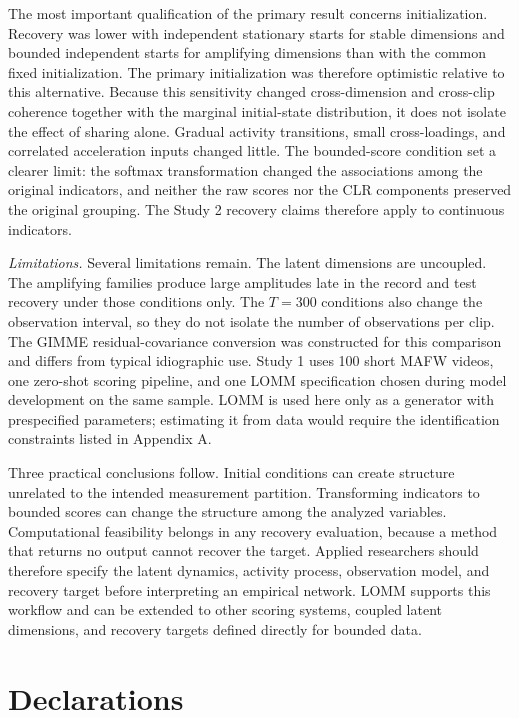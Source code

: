 \documentclass[
]{article}
\begin{document}
The most important qualification of the primary result concerns
initialization. Recovery was lower with independent stationary starts
for stable dimensions and bounded independent starts for amplifying
dimensions than with the common fixed initialization. The primary
initialization was therefore optimistic relative to this alternative.
Because this sensitivity changed cross-dimension and cross-clip
coherence together with the marginal initial-state distribution, it does
not isolate the effect of sharing alone. Gradual activity transitions,
small cross-loadings, and correlated acceleration inputs changed little.
The bounded-score condition set a clearer limit: the softmax
transformation changed the associations among the original indicators,
and neither the raw scores nor the CLR components preserved the original
grouping. The Study 2 recovery claims therefore apply to continuous
indicators.

\emph{Limitations.} Several limitations remain. The latent dimensions
are uncoupled. The amplifying families produce large amplitudes late in
the record and test recovery under those conditions only. The \(T=300\)
conditions also change the observation interval, so they do not isolate
the number of observations per clip. The GIMME residual-covariance
conversion was constructed for this comparison and differs from typical
idiographic use. Study 1 uses 100 short MAFW videos, one zero-shot
scoring pipeline, and one LOMM specification chosen during model
development on the same sample. LOMM is used here only as a generator
with prespecified parameters; estimating it from data would require the
identification constraints listed in Appendix A.

Three practical conclusions follow. Initial conditions can create
structure unrelated to the intended measurement partition. Transforming
indicators to bounded scores can change the structure among the analyzed
variables. Computational feasibility belongs in any recovery evaluation,
because a method that returns no output cannot recover the target.
Applied researchers should therefore specify the latent dynamics,
activity process, observation model, and recovery target before
interpreting an empirical network. LOMM supports this workflow and can
be extended to other scoring systems, coupled latent dimensions, and
recovery targets defined directly for bounded data.

\newpage

\section{Declarations}\label{declarations}
\end{document}
